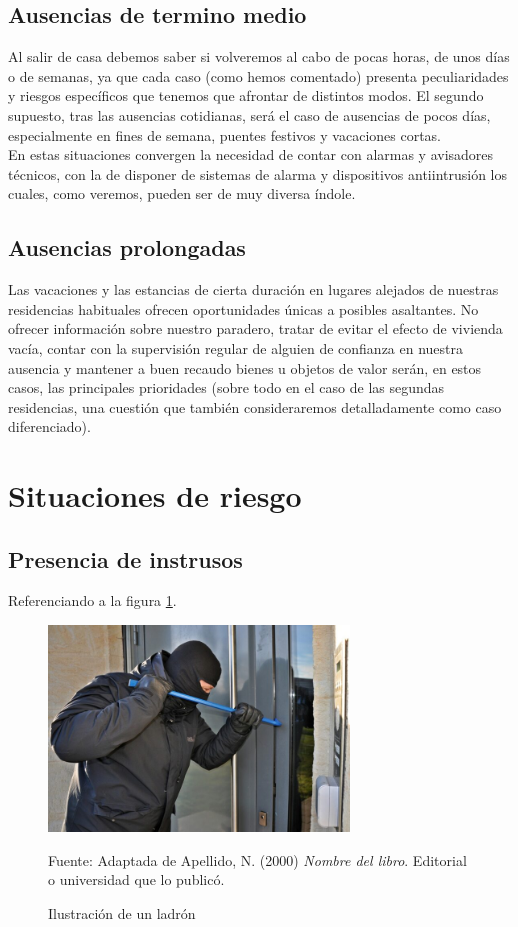 \subsection{Ausencias de termino medio}
Al salir de casa debemos saber si volveremos al cabo de pocas horas, de unos días o de semanas, ya que cada caso (como hemos comentado) presenta peculiaridades y riesgos específicos que tenemos que afrontar de distintos modos. El segundo supuesto, tras las ausencias cotidianas, será el caso de ausencias de pocos días, especialmente en fines de semana, puentes festivos y vacaciones cortas.\\
 
En estas situaciones convergen la necesidad de contar con alarmas y avisadores técnicos, con la de disponer de sistemas de alarma y dispositivos antiintrusión los cuales, como veremos, pueden ser de muy diversa índole.\\

\subsection{Ausencias prolongadas}
Las vacaciones y las estancias de cierta duración en lugares alejados de nuestras residencias habituales ofrecen oportunidades únicas a posibles asaltantes. No ofrecer información sobre nuestro paradero, tratar de evitar el efecto de vivienda vacía, contar con la supervisión regular de alguien de confianza en nuestra ausencia y mantener a buen recaudo bienes u objetos de valor serán, en estos casos, las principales prioridades (sobre todo en el caso de las segundas residencias, una cuestión que también consideraremos detalladamente como caso diferenciado).\\

\section{Situaciones de riesgo}
\subsection{Presencia de instrusos}

Referenciando a la figura \ref{fig:ejemplo}.
\begin{figure}[H]
    \begin{center}
        \includegraphics[width=8cm]{img/capitulo_3/burglar.jpg}
    \end{center}
    \caption{Ilustración de un ladrón}
    Fuente: Adaptada de Apellido, N. (2000) \textit{Nombre del libro}.
    Editorial o universidad que lo publicó.
    \label{fig:ejemplo}
\end{figure}

